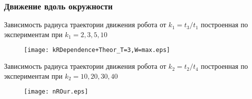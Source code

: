 \begin{frame}
\frametitle{Движение вдоль окружности}

Зависимость радиуса траектории движения робота от $k_1 ={t_3}/{t_1}$ построенная по экспериментам при $k_1 = 2, 3, 5, 10$

\begin{figure}[!ht]
	\centering
	\texttt{[image: kRDependence+Theor\_T=3,W=max.eps]}
\end{figure}
	
Зависимость радиуса траектории движения робота от $k_2 = {t_2}/{t_4}$ построенная по экспериментам при $k_2 = 10, 20, 30, 40$

\begin{figure}[!ht]
	\centering
	\texttt{[image: nROur.eps]}
\end{figure}		

\end{frame}


